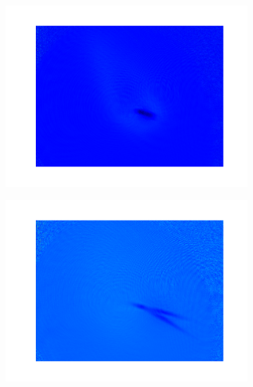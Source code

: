 \begin{figure}
    \centering
    \begin{subfigure}[b]{0.3\textwidth}
        \includegraphics[width=1.1\textwidth]{figs/ODTimage1.pdf}
    \end{subfigure}\begin{subfigure}[b]{0.3\textwidth}
        \includegraphics[width=1.1\textwidth]{figs/ODTimage2.pdf}
    \end{subfigure}\begin{subfigure}[b]{0.3\textwidth}

\end{subfigure}
\end{figure}
